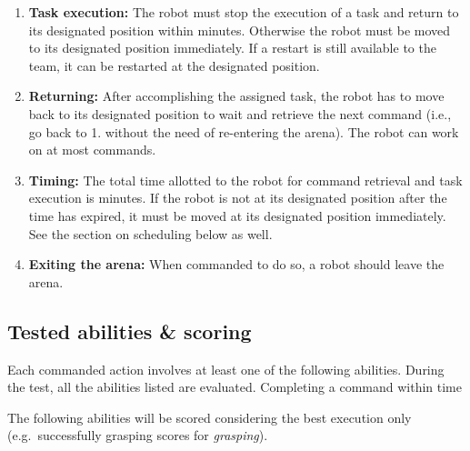 \begin{enumerate}
	\item \textbf{Task execution:} The robot must stop the execution of a task and return to its designated position within \eegpsrMaxCmdTime minutes. Otherwise the robot must be moved to its designated position immediately. If a restart is still available to the team, it can be restarted at the designated position. \\

	\item \textbf{Returning:} After accomplishing the assigned task, the robot has to move back to its designated position to wait and retrieve the next command (i.e., go back to 1. without the need of re-entering the arena). The robot can work on at most \eegpsrMaxCmd commands. \\

	\item \textbf{Timing:} The total time allotted to the robot for command retrieval and task execution is \eegpsrMaxTeamTime minutes. If the robot is not at its designated position after the time has expired, it must be moved at its designated position immediately. See the section on scheduling below as well.\\

	\item \textbf{Exiting the arena:} When commanded to do so, a robot should leave the arena. \\

\end{enumerate}

\subsection{Tested abilities \& scoring}
\label{sec:eegpsr-abilities}
Each commanded action involves at least one of the following abilities. During the test, all the abilities listed are evaluated. Completing a command within time 

The following abilities will be scored considering the best execution only (e.g.~successfully grasping scores for \textit{grasping}).

